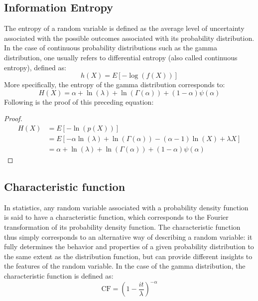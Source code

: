 \documentclass[12pt]{article}
\begin{document}
\subsection{Information Entropy}
The entropy of a random variable is defined as the average level of uncertainty associated with the possible outcomes
associated with its probability distribution. In the case of continuous probability distributions such as the gamma
distribution, one usually refers to differential entropy (also called continuous entropy), defined
as\cite{wikipediaDifferentialEntropy2022, wikipediaGammaDistribution2022}:
\begin{equation}
	h(X) = E[-\log(f(X))]
\end{equation}
More specifically, the entropy of the gamma distribution corresponds to:
\begin{equation}
	H(X) = \alpha + \ln(\lambda) + \ln(\Gamma(\alpha)) + (1-\alpha)\psi(\alpha)
\end{equation}
Following is the proof of this preceding equation:
\begin{proof}
	\begin{equation}
		\begin{split}
			H(X)	&=	E[-\ln(p(X))]\\
					&=	E[-\alpha\ln(\lambda) + \ln(\Gamma(\alpha)) - (\alpha-1)\ln(X) + \lambda X]\\
					&=	\alpha + \ln(\lambda) + \ln(\Gamma(\alpha)) + (1-\alpha)\psi(\alpha)
		\end{split}
	\end{equation}
\end{proof}

\subsection{Characteristic function}\label{subec:advancedproperties:cf}
In statistics, any random variable associated with a probability density function is said to have a characteristic
function, which corresponds to the Fourier transformation of its probability density function. The characteristic
function thus simply corresponds to an alternative way of describing a random variable: it fully determines the behavior
and properties of a given probability distribution to the same extent as the distribution function, but can provide
different insights to the features of the random variable. In the case of the gamma distribution, the characteristic
function is defined as\cite{wikipediaCharacteristicFunctionProbability2022}:
\begin{equation}
	\text{CF} = \left(1-\frac{it}{\lambda}\right)^{-\alpha}
\end{equation}
\end{document}
